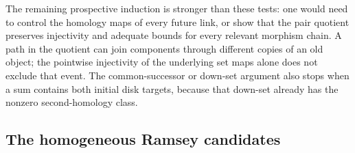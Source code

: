 The remaining prospective induction is stronger than these tests:
one would need to control the homology maps of every future link,
or show that the pair quotient preserves injectivity and adequate
bounds for every relevant morphism chain. A path in the quotient
can join components through different copies of an old object;
the pointwise injectivity of the underlying set maps alone does
not exclude that event. The common-successor or down-set argument
also stops when a sum contains both initial disk targets, because
that down-set already has the nonzero second-homology class.

\subsection{The homogeneous Ramsey candidates}

